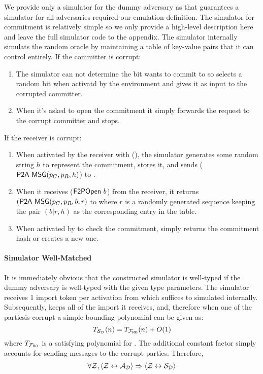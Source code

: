 We provide only a simulator for the dummy adversary as that guarantees a simulator for all adversaries required our emulation definition.
The simulator for commitment is relatively simple so we only provide a high-level description here and leave the full simulator code to the appendix.
The simulator internally simulats the random oracle by maintaining a table of key-value pairs that it can control entirely.
If the committer is corrupt:
\begin{enumerate}
\item The simulator can not determine the bit \Environment wants to commit to so selects a random bit when activatd by the environment and gives it as input to the corrupted committer.
\item When it's asked to open the commitment it simply forwards the request to the corrupt committer and stops.
\end{enumerate}
If the receiver is corrupt:
\begin{enumerate}
\item When activated by the receiver with (), the simulator generates some random string $h$ to represent the commitment, stores it, and sends (${\mathsf {P2A}}\ {\mathsf {MSG}}(p_C, p_R, h)$) to \Environment.
\item When it receives ($\msf{F2POpen}\ b$) from the receiver, it returns $({\mathsf {P2A}}\ {\mathsf {MSG}}(p_C, p_R, b, r)$ to \Environment where $r$ is a randomly generated sequence keeping the pair $(b | r, h)$ as the corresponding entry in the table.
\item When activated by \Environment to check the commitment, \Simulator simply returns the commitment hash or creates a new one.
\end{enumerate}

\paragraph{Simulator Well-Matched}
It is immediately obvious that the constructed simulator is well-typed if the dummy adversary is well-typed with the given type parameters.
The simulator receives 1 import token per activation from \Environment which suffices to simulated \Fro internally. 
Subsequently, \Simulator keeps all of the import it receives, and, therefore when one of the partiesis corrupt a simple bounding polynomial can be given as:
\[
	T_{\mathcal{S}_{\mathcal{D}}}(n) = T_{\mathcal{F}_{{\mathsf {RO}}}}(n) + O(1)
\]
where $T_{\mathcal{F}_{{\mathsf {RO}}}}$ is a satisfying polynomial for \Fro. The additional constant factor simply accounts for sending messages to the corrupt parties.
Therefore,
\begin{gather}
	\forall \mathcal{Z}, \langle \mathcal{Z} \leftrightarrow \mathcal{A}_\mathcal{D} \rangle \Rightarrow \langle \mathcal{Z} \leftrightarrow \mathcal{S}_{\mathcal{D}} \rangle
\end{gather}


